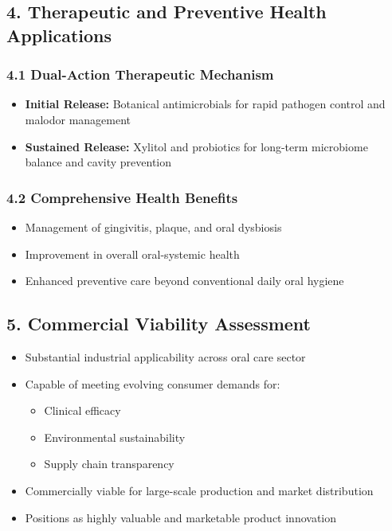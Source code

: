 \documentclass[12pt]{article}
\begin{document}
\subsection*{4. Therapeutic and Preventive Health Applications}

\subsubsection*{4.1 Dual-Action Therapeutic Mechanism}
\begin{itemize}
    \item \textbf{Initial Release:} Botanical antimicrobials for rapid pathogen control and malodor management
    \item \textbf{Sustained Release:} Xylitol and probiotics for long-term microbiome balance and cavity prevention
\end{itemize}

\subsubsection*{4.2 Comprehensive Health Benefits}
\begin{itemize}
    \item Management of gingivitis, plaque, and oral dysbiosis
    \item Improvement in overall oral-systemic health
    \item Enhanced preventive care beyond conventional daily oral hygiene
\end{itemize}

\subsection*{5. Commercial Viability Assessment}
\begin{itemize}
    \item Substantial industrial applicability across oral care sector
    \item Capable of meeting evolving consumer demands for:
    \begin{itemize}
        \item Clinical efficacy
        \item Environmental sustainability
        \item Supply chain transparency
    \end{itemize}
    \item Commercially viable for large-scale production and market distribution
    \item Positions as highly valuable and marketable product innovation
\end{itemize}
\end{document}

